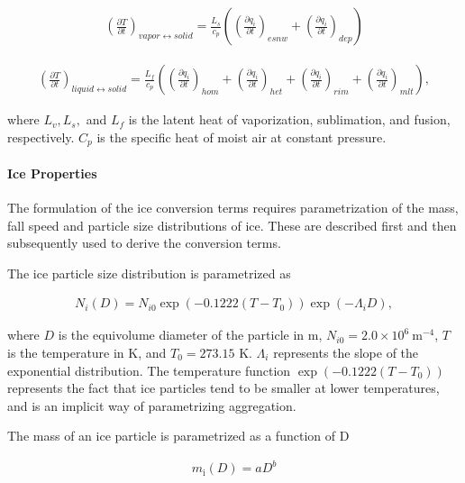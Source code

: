\begin{eqnarray}
\left(\frac{\partial T}{\partial t}\right)_{vapor \leftrightarrow solid}
=\frac{L_{s}}{c_{p}}\left(
\left(\frac{\partial q_i}{\partial t}\right)_{esnw}
+\left(\frac{\partial q_i}{\partial t}\right)_{dep}
\right)
\end{eqnarray}

\begin{eqnarray}
\left(\frac{\partial T}{\partial t}\right)_{liquid \leftrightarrow solid}
=\frac{L_{f}}{c_{p}}\left(
\left(\frac{\partial q_i}{\partial t}\right)_{hom}
+\left(\frac{\partial q_i}{\partial t}\right)_{het}
+\left(\frac{\partial q_i}{\partial t}\right)_{rim}
+\left(\frac{\partial q_i}{\partial t}\right)_{mlt}
\right),
\end{eqnarray}

where \(L_v, L_s,\) and \(L_f\) is the latent heat of vaporization,
sublimation, and fusion, respectively. \(C_p\) is the specific heat of
moist air at constant pressure.

\hypertarget{ice-properties}{%
\paragraph{Ice Properties}\label{ice-properties}}

The formulation of the ice conversion terms requires parametrization of
the mass, fall speed and particle size distributions of ice. These are
described first and then subsequently used to derive the conversion
terms.

The ice particle size distribution is parametrized as

\begin{eqnarray}
N_{i}(D)=N_{i0} \exp (-0.1222 (T-T_{0})) \exp \left(-\Lambda_{i} D\right),
\label{WB99.A1}
\end{eqnarray}

where \(D\) is the equivolume diameter of the particle in
\(\mathrm{m}\), \(N_{i0}=2.0 \times 10^{6} \mathrm{~m}^{-4}\), \(T\) is
the temperature in \(\mathrm{K}\), and \(T_{0}= 273.15\) \(\mathrm{K}\).
\(\Lambda_{i}\) represents the slope of the exponential distribution.
The temperature function \(\exp (-0.1222 (T-T_0))\) represents the fact
that ice particles tend to be smaller at lower temperatures, and is an
implicit way of parametrizing aggregation.

The mass of an ice particle is parametrized as a function of D

\begin{eqnarray}
m_{\mathrm{i}}(D)=a D^{b}
\label{WB99.A2}
\end{eqnarray}

